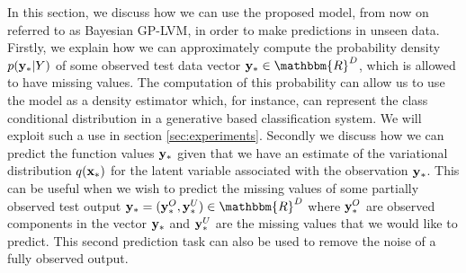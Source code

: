 \documentclass[twoside,times]{article}
\begin{document}
In this section, we discuss how we can use the proposed model, from
now on referred to as Bayesian GP-LVM, in order to make predictions in
unseen data. Firstly, we explain how we can approximately compute the
probability density $p(\mathbf{y}_* | Y)$ of some observed test data vector
$\bfy_* \in \mathbbm{R}^D $, which is allowed to have missing
values. The computation of this probability can allow us to use the
model as a density estimator which, for instance, can represent the
class conditional distribution in a generative based classification
system.  We will exploit such a use in section \ref{sec:experiments}.
Secondly we discuss how we can predict the function values $\mathbf{y}_*$
given that we have an estimate of the variational distribution
$q(\mathbf{x}_*)$ for the latent 
variable associated with  the observation $\mathbf{y}_*$. This can be useful 
when we wish to predict the missing values of some partially
observed test output $\bfy_* = (\bfy_*^O,\bfy_{*}^U) \in
\mathbbm{R}^D$ where $\mathbf{y}_*^O$ are observed components in the
vector $\mathbf{y}_*$ and $\mathbf{y}_*^U$ are the missing values that we would
like to predict. This second prediction task can also be used to 
remove the noise of a fully observed output. 
\end{document}
